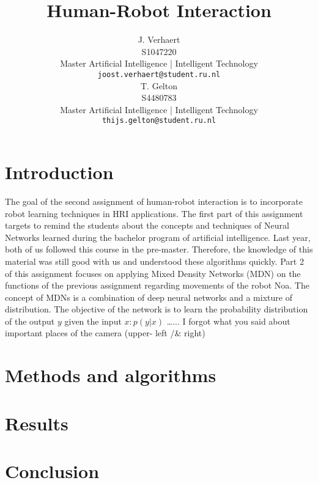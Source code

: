 \documentclass{article}
\title{Human-Robot Interaction}
\date{}
\author{
    J. Verhaert \\
    S1047220\\
    Master Artificial Intelligence | Intelligent Technology \\
    \texttt{joost.verhaert@student.ru.nl} \\
    \And
    T. Gelton \\
    S4480783\\
    Master Artificial Intelligence | Intelligent Technology \\
    \texttt{thijs.gelton@student.ru.nl} \\
}
\begin{document}
    \maketitle
    \pagebreak


    \section{Introduction}\label{sec:introduction}
    The goal of the second assignment of human-robot interaction is to incorporate robot learning techniques in HRI applications. The first part of this assignment targets to remind the students about the concepts and techniques of Neural Networks learned during the bachelor program of artificial intelligence. Last year, both of us followed this course in the pre-master. Therefore, the knowledge of this material was still good with us and understood these algorithms quickly. Part 2 of this assignment focuses on applying Mixed Density Networks (MDN) on the functions of the previous assignment regarding movements of the robot Noa. The concept of MDNs is a combination of deep neural networks and a mixture of distribution. The objective of the network is to learn the probability distribution of the output $y$ given the input $x: p(y|x)$ …...  I forgot what you said about important places of the camera (upper- left /& right)


    \section{Methods and algorithms}\label{sec:methods-and-algorithms}


    \section{Results}\label{sec:results}


    \section{Conclusion}\label{sec:conclusion}


    
    
\end{document}
